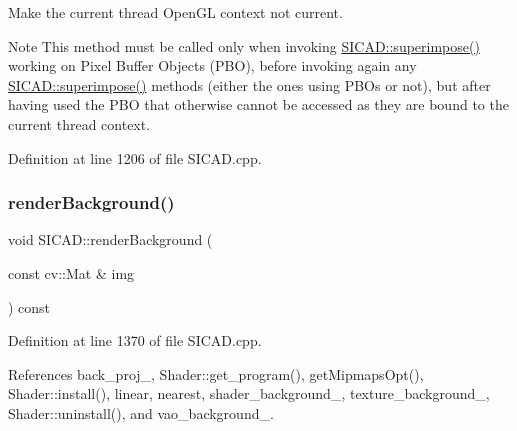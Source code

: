 Make the current thread Open\+GL context not current. 

\begin{DoxyNote}{Note}
This method must be called only when invoking {\ttfamily \mbox{\hyperlink{classSICAD_a356e0ac8a0f130952a72326bedd4ab60}{S\+I\+C\+A\+D\+::superimpose()}}} working on Pixel Buffer Objects (P\+BO), before invoking again any {\ttfamily \mbox{\hyperlink{classSICAD_a356e0ac8a0f130952a72326bedd4ab60}{S\+I\+C\+A\+D\+::superimpose()}}} methods (either the ones using P\+B\+Os or not), but after having used the P\+BO that otherwise cannot be accessed as they are bound to the current thread context. 
\end{DoxyNote}


Definition at line 1206 of file S\+I\+C\+A\+D.\+cpp.

\mbox{\label{classSICAD_a46fcf7ddb480a788463a4d98d26e12e8}} 
\subsubsection{\texorpdfstring{render\+Background()}{renderBackground()}}
{\footnotesize\ttfamily void S\+I\+C\+A\+D\+::render\+Background (\begin{DoxyParamCaption}\item[{const cv\+::\+Mat \&}]{img }\end{DoxyParamCaption}) const\hspace{0.3cm}{\ttfamily [private]}}



Definition at line 1370 of file S\+I\+C\+A\+D.\+cpp.



References back\+\_\+proj\+\_\+, Shader\+::get\+\_\+program(), get\+Mipmaps\+Opt(), Shader\+::install(), linear, nearest, shader\+\_\+background\+\_\+, texture\+\_\+background\+\_\+, Shader\+::uninstall(), and vao\+\_\+background\+\_\+.

